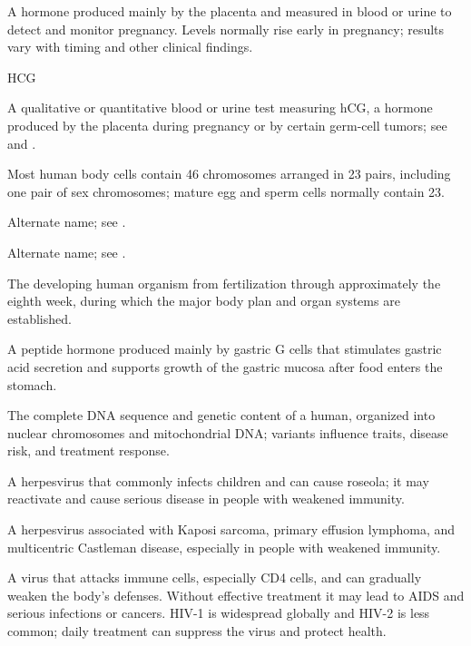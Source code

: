  A hormone produced mainly by the placenta and measured in blood or urine to detect and monitor pregnancy. Levels normally rise early in pregnancy; results vary with timing and other clinical findings.

\synonyms
HCG

 A qualitative or quantitative blood or urine test measuring hCG, a hormone produced by the placenta during pregnancy or by certain germ-cell tumors; see  and .

 Most human body cells contain 46 chromosomes arranged in 23 pairs, including one pair of sex chromosomes; mature egg and sperm cells normally contain 23.

 Alternate name; see .

 Alternate name; see .

 The developing human organism from fertilization through approximately the eighth week, during which the major body plan and organ systems are established.

 A peptide hormone produced mainly by gastric G cells that stimulates gastric acid secretion and supports growth of the gastric mucosa after food enters the stomach.

 The complete DNA sequence and genetic content of a human, organized into nuclear chromosomes and mitochondrial DNA; variants influence traits, disease risk, and treatment response.

 A herpesvirus that commonly infects children and can cause roseola; it may reactivate and cause serious disease in people with weakened immunity.

 A herpesvirus associated with Kaposi sarcoma, primary effusion lymphoma, and multicentric Castleman disease, especially in people with weakened immunity.

 A virus that attacks immune cells, especially CD4 cells, and can gradually weaken the body’s defenses. Without effective treatment it may lead to AIDS and serious infections or cancers. HIV-1 is widespread globally and HIV-2 is less common; daily treatment can suppress the virus and protect health.

